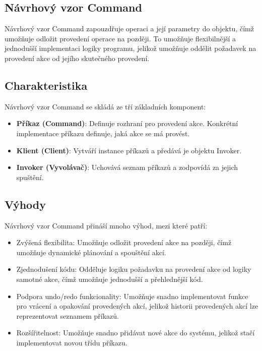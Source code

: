 \documentclass{article}
\begin{document}
    \break

    \begin{Návrhový vzor - Command}
        \section{Návrhový vzor Command}
        Návrhový vzor Command zapouzdřuje operaci a její parametry do objektu, čímž umožňuje odložit provedení operace na později.
        To umožňuje flexibilnější a jednodušší implementaci logiky programu, jelikož umožňuje oddělit požadavek na provedení akce od jejího skutečného provedení.

        \subsection{Charakteristika}

        Návrhový vzor Command se skládá ze tří základních komponent:

        \begin{itemize}
            \item \textbf{Příkaz (Command)}: Definuje rozhraní pro provedení akce.
            Konkrétní implementace příkazu definuje, jaká akce se má provést.
            \item \textbf{Klient (Client)}: Vytváří instance příkazů a předává je objektu Invoker.
            \item \textbf{Invoker (Vyvolávač)}: Uchovává seznam příkazů a zodpovídá za jejich spuštění.
        \end{itemize}

        \subsection{Výhody}

        Návrhový vzor Command přináší mnoho výhod, mezi které patří:

        \begin{itemize}
            \item Zvýšená flexibilita: Umožňuje odložit provedení akce na později, čímž umožňuje dynamické plánování a spouštění akcí.
            \item Zjednodušení kódu: Odděluje logiku požadavku na provedení akce od logiky samotné akce, čímž umožňuje jednodušší a přehlednější kód.
            \item Podpora undo/redo funkcionality: Umožňuje snadno implementovat funkce pro vrácení a opakování provedených akcí, jelikož historii provedených akcí lze reprezentovat seznamem příkazů.
            \item Rozšířitelnost: Umožňuje snadno přidávat nové akce do systému, jelikož stačí implementovat novou třídu příkazu.
        \end{itemize}


\end{Návrhový vzor - Command}
\end{document}
